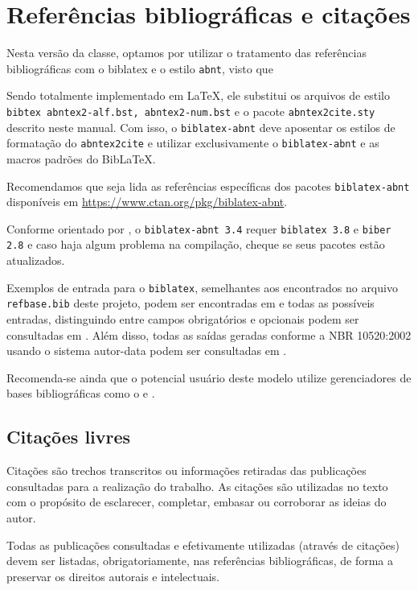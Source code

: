 \section{Referências bibliográficas e citações}

Nesta versão da classe, optamos por utilizar o tratamento das referências bibliográficas com o {\ttfamily biblatex} e o estilo \texttt{abnt}, visto que
\begin{citacao}
Sendo totalmente implementado em \LaTeX, ele substitui os arquivos de estilo \verb|bibtex abntex2-alf.bst, abntex2-num.bst| e o pacote \verb|abntex2cite.sty| descrito neste manual. Com isso, o \verb|biblatex-abnt| deve aposentar os estilos de formatação do \verb|abntex2cite| e utilizar exclusivamente o \verb|biblatex-abnt| e as macros padrões do Bib\LaTeX. \cite{araujopacote}
\end{citacao}

Recomendamos que seja lida as referências específicas dos pacotes \verb|biblatex-abnt| disponíveis em \url{https://www.ctan.org/pkg/biblatex-abnt}.

Conforme orientado por \textcite{marquesbiblatex}, o \verb|biblatex-abnt 3.4| requer \verb|biblatex 3.8| e \verb|biber 2.8| e caso haja algum problema na compilação, cheque se seus pacotes estão atualizados.

Exemplos de entrada para o \verb|biblatex|, semelhantes aos encontrados no arquivo \verb|refbase.bib| deste projeto, podem ser encontradas em \textcite{marquesbiblatex} e todas as possíveis entradas, distinguindo entre campos obrigatórios e opcionais podem ser consultadas em \cite{lehman2006biblatex}. Além disso, todas as saídas geradas conforme a NBR 10520:2002 usando o sistema autor-data podem ser consultadas em \textcite{marquesexemplos}.

Recomenda-se ainda que o potencial usuário deste modelo utilize gerenciadores de bases bibliográficas como o \textcite{JabRef2009} e \textcite{Zotero}.

\subsection{Citações livres}\label{citacoesLivres}
Citações são trechos transcritos ou informações retiradas das publicações consultadas para a realização do trabalho.
As citações são utilizadas no texto com o propósito de esclarecer, completar, embasar ou corroborar as ideias do autor.

Todas as publicações consultadas e efetivamente utilizadas (através de citações) devem ser listadas, obrigatoriamente, nas referências bibliográficas, de forma a preservar os direitos autorais e intelectuais.

